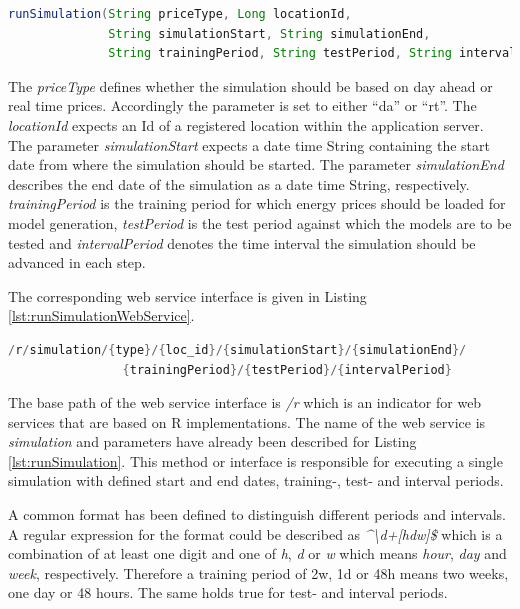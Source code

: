 \begin{minipage}{\linewidth}
\begin{lstlisting}[language=Java, caption=Method runSimulation, label={lst:runSimulation}]
runSimulation(String priceType, Long locationId, 
              String simulationStart, String simulationEnd,
              String trainingPeriod, String testPeriod, String intervalPeriod)
\end{lstlisting}
\end{minipage}

The \textit{priceType} defines whether the simulation should be based on day ahead or real time prices. Accordingly the parameter is set to either ``da'' or ``rt''. The \textit{locationId} expects an Id of a registered location within the application server. The parameter \textit{simulationStart} expects a date time String containing the start date from where the simulation should be started. The parameter \textit{simulationEnd} describes the end date of the simulation as a date time String, respectively. \textit{trainingPeriod} is the training period for which energy prices should be loaded for model generation, \textit{testPeriod} is the test period against which the models are to be tested and \textit{intervalPeriod} denotes the time interval the simulation should be advanced in each step. 

The corresponding web service interface is given in Listing \ref{lst:runSimulationWebService}. 

\begin{minipage}{\linewidth}
\begin{lstlisting}[language=Java, caption=Method runSimulation web service interface, label={lst:runSimulationWebService}]
/r/simulation/{type}/{loc_id}/{simulationStart}/{simulationEnd}/
                {trainingPeriod}/{testPeriod}/{intervalPeriod}
\end{lstlisting}
\end{minipage}

The base path of the web service interface is \textit{/r} which is an indicator for web services that are based on R implementations. The name of the web service is \textit{simulation} and parameters have already been described for Listing \ref{lst:runSimulation}. This method or interface is responsible for executing a single simulation with defined start and end dates, training-, test- and interval periods. 

A common format has been defined to distinguish different periods and intervals. A regular expression for the format could be described as \textit{\textasciicircum\textbackslash d+[hdw]\$}
which is a combination of at least one digit and one of \textit{h}, \textit{d} or \textit{w} which means \textit{hour}, \textit{day} and \textit{week}, respectively. 
Therefore a training period of 2w, 1d or 48h means two weeks, one day or 48 hours. The same holds true for test- and interval periods. 

